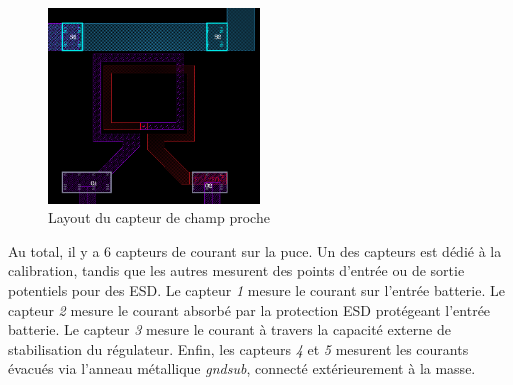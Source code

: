 \begin{figure}[!h]
  \centering
  \includegraphics[width=0.5\textwidth]{src/1/figures/sensor_layout.png}
  \caption{Layout du capteur de champ proche}
  \label{fig:near-field-current-sensor-layout}
\end{figure}

Au total, il y a 6 capteurs de courant sur la puce.
Un des capteurs est dédié à la calibration, tandis que les autres mesurent des points d'entrée ou de sortie potentiels pour des ESD.
Le capteur \textit{1} mesure le courant sur l'entrée batterie.
Le capteur \textit{2} mesure le courant absorbé par la protection ESD protégeant l'entrée batterie.
Le capteur \textit{3} mesure le courant à travers la capacité externe de stabilisation du régulateur.
Enfin, les capteurs \textit{4} et \textit{5} mesurent les courants évacués via l'anneau métallique \textit{gndsub}, connecté extérieurement à la masse.
